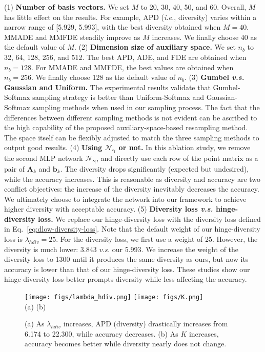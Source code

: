 \documentclass[sigconf,screen,nonacm]{acmart}
\begin{document}
	(1) \textbf{Number of basis vectors.} We set $M$ to 20, 30, 40, 50, and 60. Overall, $M$ has little effect on the results. For example, APD (\textit{i.e.}, diversity) varies within a narrow range of [5.929, 5.993], with the best diversity obtained when $M=40$. MMADE and MMFDE steadily improve as $M$ increases. We finally choose 40 as the default value of $M$.
	(2) \textbf{Dimension size of auxiliary space.} We set $n_b$ to 32, 64, 128, 256, and 512. The best APD, ADE, and FDE are obtained when $n_b=128$. For MMADE and MMFDE, the best values are obtained when $n_b=256$. We finally choose 128 as the default value of $n_b$.
	(3) \textbf{Gumbel \textit{v.s.} Gaussian and Uniform.} The experimental results validate that Gumbel-Softmax sampling strategy is better than Uniform-Softmax and Gaussian-Softmax sampling methods when used in our sampling process. The fact that the differences between different sampling methods is not evident can be ascribed to the high capability of the proposed auxiliary-space-based resampling method. The space itself can be flexibly adjusted to match the three sampling methods to output good results. (4) \textbf{Using $\mathcal{N}_{\bm{\gamma}}$ or not.} In this ablation study, we remove the second MLP network $\mathcal{N}_{\bm{\gamma}}$, and directly use each row of the point matrix as a pair of $\mathbf{A}_k$ and $\mathbf{b}_k$. The diversity drops significantly (expected but undesired), while the accuracy increases. This is reasonable as diversity and accuracy are two conflict objectives: the increase of the diversity inevitably decreases the accuracy. We ultimately choose to integrate the network into our framework to achieve higher diversity with acceptable accuracy.
	(5) \textbf{Diversity loss \textit{v.s.} hinge-diversity loss.} We replace our hinge-diversity loss with the diversity loss defined in Eq.~\ref{eq:dlow-diversity-loss}. Note that the default weight of our hinge-diversity loss is $\lambda_{hdiv}=25$. For the diversity loss, we first use a weight of 25. However, the diversity is much lower: 3.843 \textit{v.s.} our 5.993. We increase the weight of the diversity loss to 1300 until it produces the same diversity as ours, but now its accuracy is lower than that of our hinge-diversity loss. These studies show our hinge-diversity loss better prompts diversity while less affecting the accuracy.
	




	
	\begin{figure}[!t]
		\centering
		\texttt{[image: figs/lambda\_hdiv.png]}
		\hspace{0.1cm}
		\texttt{[image: figs/K.png]} \\
		\flushleft \hspace{2cm} (a) \hspace{3.5cm} (b)
		\caption{(a) As $\lambda_{hdiv}$ increases, APD (diversity) drastically increases from 6.174 to 22.300, while accuracy decreases. (b) As $K$ increases, accuracy becomes better while diversity nearly does not change.}
		\label{fig:two_curves}
	\end{figure}
	
\end{document}
